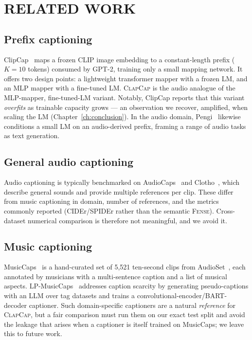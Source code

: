 \documentclass[9pt]{report}
\newcommand{\fense}{\textsc{Fense}}
\newcommand{\sys}{\textsc{ClapCap}}
\begin{document}
\chapter{RELATED WORK}\label{ch:related}

\section{Prefix captioning}
ClipCap~\cite{mokady2021clipcap} maps a frozen CLIP image embedding to a constant-length prefix
($K{=}10$ tokens) consumed by GPT-2, training only a small mapping network. It offers two design
points: a lightweight transformer mapper with a frozen LM, and an MLP mapper with a fine-tuned
LM. \sys{} is the audio analogue of the MLP-mapper, fine-tuned-LM variant. Notably, ClipCap
reports that this variant \emph{overfits} as trainable capacity grows --- an observation we
recover, amplified, when scaling the LM (Chapter~\ref{ch:conclusion}). In the audio domain,
Pengi~\cite{deshmukh2023pengi} likewise conditions a small LM on an audio-derived prefix,
framing a range of audio tasks as text generation.

\section{General audio captioning}
Audio captioning is typically benchmarked on AudioCaps~\cite{kim2019audiocaps} and
Clotho~\cite{drossos2020clotho}, which describe general sounds and provide multiple references
per clip. These differ from music captioning in domain, number of references, and the metrics
commonly reported (CIDEr/SPIDEr rather than the semantic \fense{}). Cross-dataset numerical
comparison is therefore not meaningful, and we avoid it.

\section{Music captioning}
MusicCaps~\cite{agostinelli2023musiclm} is a hand-curated set of 5{,}521 ten-second clips from
AudioSet~\cite{gemmeke2017audioset}, each annotated by musicians with a multi-sentence caption
and a list of musical aspects. LP-MusicCaps~\cite{doh2023lpmusiccaps} addresses caption scarcity
by generating pseudo-captions with an LLM over tag datasets and trains a
convolutional-encoder/BART-decoder captioner. Such domain-specific captioners are a natural
\emph{reference} for \sys{}, but a fair comparison must run them on our exact test split and
avoid the leakage that arises when a captioner is itself trained on MusicCaps; we leave this to
future work.
\end{document}
